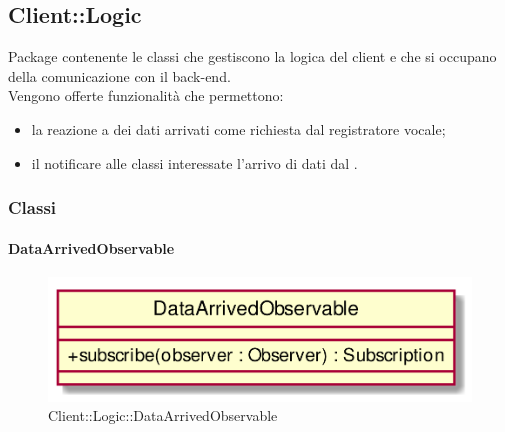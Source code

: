 \subsection{Client::Logic}
Package contenente le classi che gestiscono la logica del client e che si occupano della comunicazione con il back-end.\\
Vengono offerte funzionalità che permettono:
\begin{itemize}
\item la reazione a dei dati arrivati come richiesta dal registratore vocale;
\item il notificare alle classi interessate l'arrivo di dati dal .
\end{itemize}

\subsubsection{Classi}
\hypertarget{DataArrivedObservable_label}{\paragraph{DataArrivedObservable}}
\begin{figure}[h]
	\centering
	\includegraphics[width=\textwidth,height=\textheight,keepaspectratio]{images/ClassDataArrivedObservable.png}
	\caption{Client::Logic::DataArrivedObservable}
\end{figure}
